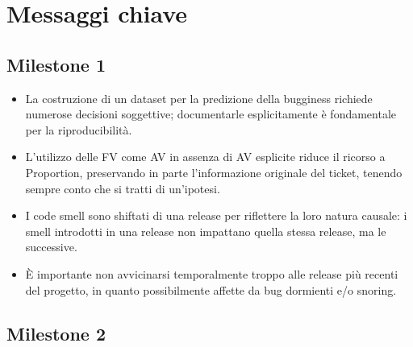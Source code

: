 \section{Messaggi chiave}

\subsection{Milestone 1}

\begin{itemize}
    \item La costruzione di un dataset per la predizione della bugginess richiede numerose
    decisioni soggettive; documentarle esplicitamente è fondamentale per la riproducibilità.

    \item L'utilizzo delle FV come AV in assenza di AV esplicite riduce il ricorso a
    Proportion, preservando in parte l'informazione originale del ticket, tenendo sempre conto che si tratti di un'ipotesi.

    \item I code smell sono shiftati di una release per riflettere la loro natura causale:
    i smell introdotti in una release non impattano quella stessa release, ma le successive.

    \item È importante non avvicinarsi temporalmente troppo alle release più recenti del progetto, in quanto possibilmente affette da bug dormienti e/o snoring.
\end{itemize}

\subsection{Milestone 2}

